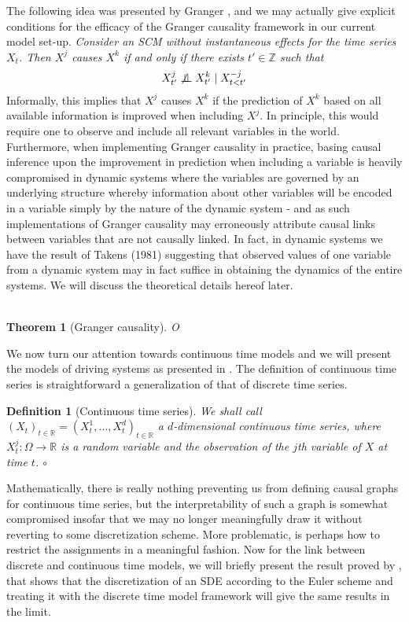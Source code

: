 \documentclass[11pt, a4paper]{memoir}
\theoremstyle{break}
\newtheorem{thm}{Theorem}
\theoremstyle{break}
\newtheorem{innerdefn}{Definition}
\newenvironment{defn}
  {\begin{innerdefn}}
  {\ensuremath{\circ}\end{innerdefn}}
\theoremstyle{nonumberplain}
\newcommand{\mZ}{\mathbb{Z}}
\newcommand{\mR}{\mathbb{R}}
\newcommand{\indep}{\perp \!\!\! \perp}
\begin{document}
The following idea was presented by Granger \cite{Granger}, and we may actually give explicit conditions for the efficacy of the Granger causality framework in our current model set-up.
\textit{Consider an SCM without instantaneous effects for the time series $X_t$. Then $X^j$ causes $X^k$ if and only if there exists $t'\in \mZ$ such that
$$X_{t'}^j\centernot \indep X_{t'}^k\mid X_{t<t'}^{-j}$$}
Informally, this implies that $X^j$ causes $X^k$ if the prediction of $X^k$ based on all available information is improved when including $X^j$. In principle, this would require one to observe and include all relevant variables in the world.\\
Furthermore, when implementing Granger causality in practice, basing causal inference upon the improvement in prediction when including a variable is heavily compromised in dynamic systems where the variables are governed by an underlying structure whereby information about other variables will be encoded in a variable simply by the nature of the dynamic system - and as such implementations of Granger causality may erroneously attribute causal links between variables that are not causally linked. In fact, in dynamic systems we have the result of Takens (1981) suggesting that observed values of one variable from a dynamic system may in fact suffice in obtaining the dynamics of the entire systems. We will discuss the theoretical details hereof later.\\\\

\begin{thm}[Granger causality]
O
\end{thm}


We now turn our attention towards continuous time models and we will present the models of driving systems as presented in \cite{mathFound}. The definition of continuous time series is straightforward a generalization of that of discrete time series.
\begin{defn}[Continuous time series]
We shall call $(X_t)_{t\in \mR}=(X_t^{1},\ldots,X_{t}^d)_{t\in \mR}$ a \emph{$d$-dimensional continuous time series}, where $X_t^j:\Omega\to \mR$ is a random variable and the observation of the $j$th variable of $X$ at time $t$.
\end{defn}

Mathematically, there is really nothing preventing us from defining causal graphs for continuous time series, but the interpretability of such a graph is somewhat compromised insofar that we may no longer meaningfully draw it without reverting to some discretization scheme. More problematic, is perhaps how to restrict the assignments in a meaningful fashion. Now for the link between discrete and continuous time models, we will briefly present the result proved by \cite{sokol2014}, that shows that the discretization of an SDE according to the Euler scheme and treating it with the discrete time model framework will give the same results in the limit.
\end{document}
